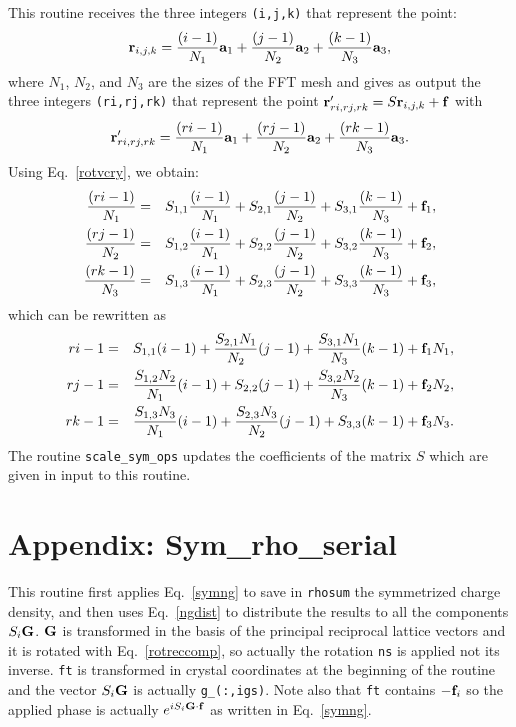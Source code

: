 \documentclass[12pt,a4paper,twoside]{report}
\begin{document}
This routine receives the three integers
\texttt{(i,j,k)} that represent the point:
\begin{equation}
{\bf r}_{i,j,k}= {(i-1) \over N_1} {\bf a}_1 +
{(j-1) \over N_2} {\bf a}_2 +
{(k-1) \over N_3} {\bf a}_3,
\end{equation}
where $N_1$, $N_2$, and $N_3$ are the sizes of the FFT mesh and gives as output the three integers
\texttt{(ri,rj,rk)} that represent the point
${\bf r}'_{ri,rj,rk}=S {\bf r}_{i,j,k}+{\bf f}$ with
\begin{equation}
{\bf r}'_{ri,rj,rk}= {(ri-1) \over N_1} {\bf a}_1 +
{(rj-1) \over N_2} {\bf a}_2 +
{(rk-1) \over N_3} {\bf a}_3.
\end{equation}
Using Eq.~\ref{rotvcry}, we obtain:
\begin{eqnarray}
{(ri-1) \over N_1} &=& S_{1,1} {(i-1) \over N_1}+
S_{2,1} {(j-1) \over N_2} + S_{3,1} {(k-1) \over N_3} + {\bf f}_1, \nonumber \\
{(rj-1) \over N_2} &=& S_{1,2} {(i-1) \over N_1}+
S_{2,2} {(j-1) \over N_2} + S_{3,2} {(k-1) \over N_3} + {\bf f}_2, \nonumber \\
{(rk-1) \over N_3} &=& S_{1,3} {(i-1) \over N_1}+
S_{2,3} {(j-1) \over N_2} + S_{3,3} {(k-1) \over N_3} + {\bf f}_3, 
\end{eqnarray}
which can be rewritten as
\begin{eqnarray}
ri-1 &=& S_{1,1} (i-1) +
{S_{2,1} N_1 \over N_2} (j-1) + {S_{3,1} N_1 \over N_3} (k-1) + {\bf f}_1 N_1, \nonumber \\
rj-1 &=& {S_{1,2} N_2 \over N_1} (i-1)+
S_{2,2} (j-1) + {S_{3,2} N_2 \over N_3}(k-1) + {\bf f}_2 N_2, \nonumber \\
rk-1 &=& {S_{1,3} N_3 \over N_1} (i-1) +
{S_{2,3} N_3 \over N_2}(j-1) + S_{3,3} (k-1)  + {\bf f}_3 N_3. 
\end{eqnarray}
The routine \texttt{scale\_sym\_ops} updates the coefficients of the matrix $S$ which are given in input to this routine. 

\section{Appendix: Sym\_rho\_serial}

This routine first applies Eq.~\ref{symng} to save in \texttt{rhosum} the symmetrized charge density, and then uses Eq.~\ref{ngdist} to distribute the results to all the components
$S_i {\bf G}$. ${\bf G}$ is transformed in the basis of the principal reciprocal lattice 
vectors and it is rotated with Eq.~\ref{rotreccomp}, so actually the rotation
\texttt{ns} is applied not its inverse. \texttt{ft} is transformed in crystal coordinates at the beginning of the routine and the vector $S_i {\bf G}$ is actually \texttt{g\_(:,igs)}. Note also that \texttt{ft} contains $-{\bf f}_i$ so the
applied phase is actually $e^{iS_i{\bf G}\cdot {\bf f}}$ as written in Eq.~\ref{symng}.
\end{document}
